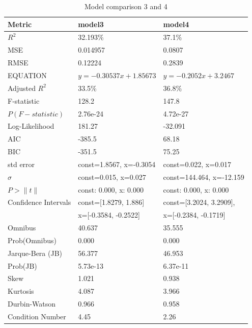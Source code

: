 \documentclass{article}
\begin{document}
  \begin{table}[H]
  
  \small
    \setlength{\extrarowheight}{-2pt} 

  \begin{tabular}{|l|l|l|}
  \hline
  \textbf{Metric} & \textbf{model3} & \textbf{model4} \\
  \hline
  $R^2$ & 32.193\% & 37.1\% \\
  \hline
  MSE & 0.014957 & 0.0807 \\
  \hline
  RMSE & 0.12224 & 0.2839 \\
  \hline
  EQUATION & $y=-0.30537x+1.85673$ & $y=-0.2052x+3.2467$ \\
  \hline
  Adjusted $R^2$ & 33.5\% & 36.8\% \\
  \hline
  F-statistic & 128.2 & 147.8 \\
  \hline
  $P(F-statistic)$ & 2.76e-24 & 4.72e-27 \\
  \hline
  Log-Likelihood & 181.27 & -32.091 \\
  \hline
  AIC & -385.5 & 68.18 \\
  \hline
  BIC & -351.5 & 75.25 \\
  \hline
  std error & const=1.8567, x=-0.3054 & const=0.022, x=0.017 \\
  \hline
  $\sigma$ & const=0.015, x=0.027 & const=144.464, x=-12.159 \\
  \hline
  $P>\|t\|$ & const: 0.000, x: 0.000 & const: 0.000, x: 0.000 \\
  \hline
  Confidence Intervals & const=[1.8279, 1.886] & const=[3.2024, 3.2909],  \\
  &  x=[-0.3584, -0.2522]&x=[-0.2384, -0.1719]\\
  \hline
  Omnibus & 40.637 & 35.555 \\
  \hline
  Prob(Omnibus) & 0.000 & 0.000 \\
  \hline
  Jarque-Bera (JB) & 56.377 & 46.953 \\
  \hline
  Prob(JB) & 5.73e-13 & 6.37e-11 \\
  \hline
  Skew & 1.021 & 0.938 \\
  \hline
  Kurtosis & 4.087 & 3.966 \\
  \hline
  Durbin-Watson & 0.966 & 0.958 \\
  \hline
  Condition Number & 4.45 & 2.26 \\
  \hline
  \end{tabular}
  \caption{Model comparison 3 and 4}
  \label{tab:modelos34}
  \end{table}
\end{document}
